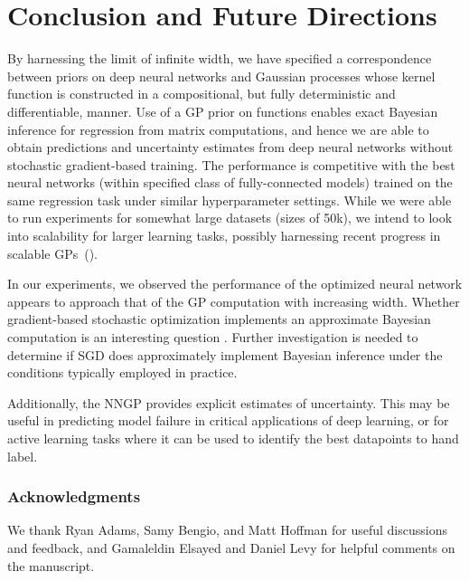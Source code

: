 \documentclass{article} %
\begin{document}
\section{Conclusion and Future Directions}
\label{sec:Conclusion}

By harnessing the limit of infinite width, we have specified a correspondence between priors on deep neural networks and Gaussian processes whose kernel function is constructed in a compositional, but fully deterministic and differentiable, manner. Use of a GP prior on functions enables exact Bayesian inference for regression from matrix computations, and hence we are able to obtain predictions and uncertainty estimates from deep neural networks without stochastic gradient-based training. The performance is competitive with the best neural networks (within specified class of fully-connected models) trained on the same regression task under similar hyperparameter settings. 
While we were able to run experiments for somewhat large datasets (sizes of 50k), we intend to look into scalability for larger learning tasks, possibly harnessing recent progress in scalable GPs~(\cite{quinonero2005unifying,hensman2013gaussian}).

In our experiments, we observed the performance of the optimized neural network appears to approach that of the GP computation with increasing width. Whether gradient-based stochastic optimization implements an approximate Bayesian computation is an interesting question \citep{mandt2017}. Further investigation is needed to determine if SGD does approximately implement Bayesian inference under the conditions typically employed in practice.


Additionally, the NNGP provides explicit estimates of uncertainty. This may be useful in predicting model failure in critical applications of deep learning, or for active learning tasks where it can be used to identify the best datapoints to hand label.


\subsubsection*{Acknowledgments}
We thank Ryan Adams, Samy Bengio, and Matt Hoffman for useful discussions and feedback, and  Gamaleldin Elsayed and Daniel Levy for helpful comments on the manuscript.



\end{document}
